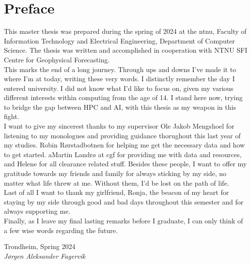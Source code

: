 \chapter*{Preface}

This master thesis was prepared during the spring of 2024 at the \acrfull{ntnu}, Faculty of Information Technology and Electrical Engineering, Department of Computer Science. The thesis was written and accomplished in cooperation with NTNU SFI Centre for Geophysical Forecasting. \\

This marks the end of a long journey. Through ups and downs I've made it to where I'm at today, writing these very words. I distinctly remember the day I entered university. I did not know what I'd like to focus on, given my various different interests within computing from the age of 14. I stand here now, trying to bridge the gap between HPC and AI, with this thesis as my weapon in this fight. \\

I want to give my sincerest thanks to my supervisor Ole Jakob Mengshoel for listening to my monologues and providing guidance thorughout this last year of my studies. Robin Rørstadbotnen for helping me get the necessary data and how to get started. aMartin Landrø at \acrlong{cgf} for providing me with data and resources, and Helene for all clearance related stuff. Besides these people, I want to offer my gratitude towards my friends and family for always sticking by my side, no matter what life threw at me. Without them, I'd be lost on the path of life. \\

Last of all I want to thank my girlfriend, Ronja, the beacon of my heart for staying by my side through good and bad days throughout this semester and for always supporting me. \\

Finally, as I leave my final lasting remarks before I graduate, I can only think of a few wise words regarding the future.

\begin{flushright}
Trondheim, Spring 2024  \\
\textit{Jørgen Aleksander Fagervik}
\end{flushright}